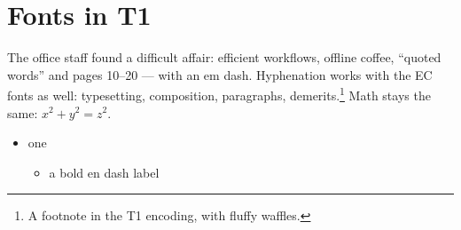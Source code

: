 \documentclass[11pt]{article}
\begin{document}
\section{Fonts in T1}
The office staff found a difficult affair: efficient workflows, offline coffee, ``quoted words'' and pages 10--20 --- with an em dash. Hyphenation works with the EC fonts as well: typesetting, composition, paragraphs, demerits.\footnote{A footnote in the T1 encoding, with fluffy waffles.} Math stays the same: $x^2+y^2=z^2$.
\begin{itemize}
\item one
  \begin{itemize}
  \item a bold en dash label
  \end{itemize}
\end{itemize}
\end{document}
